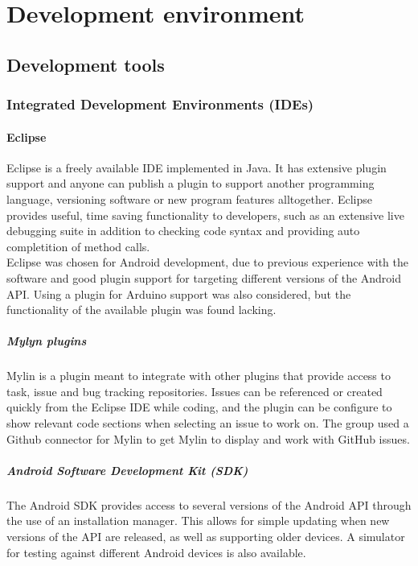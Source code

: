\section{Development environment}
\subsection{Development tools}
\subsubsection{Integrated Development Environments (IDEs)}
\paragraph{Eclipse}
Eclipse is a freely available IDE implemented in Java. It has extensive plugin support and anyone can publish a plugin to support another programming language, versioning software or new program features alltogether. Eclipse provides useful, time saving functionality to developers, such as an extensive live debugging suite in addition to checking code syntax and providing auto completition of method calls.\\
Eclipse was chosen for Android development, due to previous experience with the software and good plugin support for targeting different versions of the Android API. Using a plugin for Arduino support was also considered, but the functionality of the available plugin was found lacking. %

\subparagraph{Mylyn plugins}
Mylin is a plugin meant to integrate with other plugins that provide access to task, issue and bug tracking repositories. Issues can be referenced or created quickly from the Eclipse IDE while coding, and the plugin can be configure to show relevant code sections when selecting an issue to work on. The group used a Github connector for Mylin to get Mylin to display and work with GitHub issues.

\subparagraph{Android Software Development Kit (SDK)}
The Android SDK provides access to several versions of the Android API through the use of an installation manager. This allows for simple updating when new versions of the API are released, as well as supporting older devices. A simulator for testing against different Android devices is also available.

